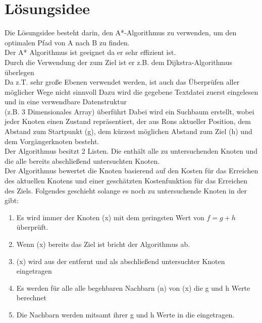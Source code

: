 \section{Lösungsidee}
\begin{flushleft}
  Die Lösungsidee besteht darin, den A*-Algorithmus zu verwenden, um den optimalen Pfad von A nach B zu finden.\\
  Der A* Algorithmus ist geeignet da er sehr effizient ist. \\
  Durch die Verwendung der \grqq{} zum Ziel ist er 
  z.B. dem Dijkstra-Algorithmus überlegen\\
  Da z.T. sehr große Ebenen verwendet werden, ist auch das Überprüfen aller möglicher Wege nicht sinnvoll
  \linebreak
  \linebreak
  Dazu wird die gegebene Textdatei zuerst eingelesen und in eine verwendbare Datenstruktur 
  \\
  (z.B. 3 Dimensionales Array) überführt
  \linebreak
  \linebreak
  Dabei wird ein Suchbaum erstellt, wobei jeder Knoten einen Zustand repräsentiert, der aus Rons aktueller Position, dem Abstand zum Startpunkt (g), dem kürzest möglichen Abstand zum Ziel (h) und dem Vorgängerknoten besteht.
  \\
  Der Algorithmus besitzt 2 Listen. Die \grqq{} enthält alle zu untersuchenden Knoten und die \grqq{} alle bereits abschließend untersuchten Knoten.
  \\
  Der Algorithmus bewertet die Knoten basierend auf den Kosten für das Erreichen des aktuellen Knotens und einer geschätzten Kostenfunktion für das Erreichen des Ziels.
  \linebreak
  \linebreak
  Folgendes geschieht solange es noch zu untersuchende Knoten in der \grqq{} gibt:
  \begin{enumerate}

    \item Es wird immer der Knoten (x) mit dem geringsten Wert von $f=g+h$ überprüft.
    \item Wenn (x) bereits das Ziel ist bricht der Algorithmus ab.
    \item (x) wird aus der \grqq{} entfernt und als abschließend untersuchter Knoten eingetragen
    \item Es werden für alle alle begehbaren Nachbarn (n) von (x) die g und h Werte berechnet
    \item Die Nachbarn werden mitsamt ihrer g und h Werte in die \grqq{} eingetragen.


\end{enumerate}
\end{flushleft}
